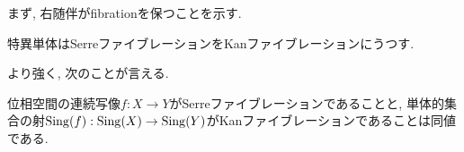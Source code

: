 \documentclass[uplatex, a4paper, 14Q, dvipdfmx]{jsarticle}
\begin{document}
まず, 右随伴がfibrationを保つことを示す. 

\begin{lemma} \label{prop:Serre_fib_is_Kan_fib}
  特異単体はSerreファイブレーションをKanファイブレーションにうつす. 
\end{lemma}


より強く, 次のことが言える. 

\begin{lemma} 
  位相空間の連続写像$f : X \to Y$がSerreファイブレーションであることと, 単体的集合の射$\mathrm{Sing}(f) : \mathrm{Sing}(X) \to \mathrm{Sing}(Y)$がKanファイブレーションであることは同値である.
\end{lemma}
\end{document}
